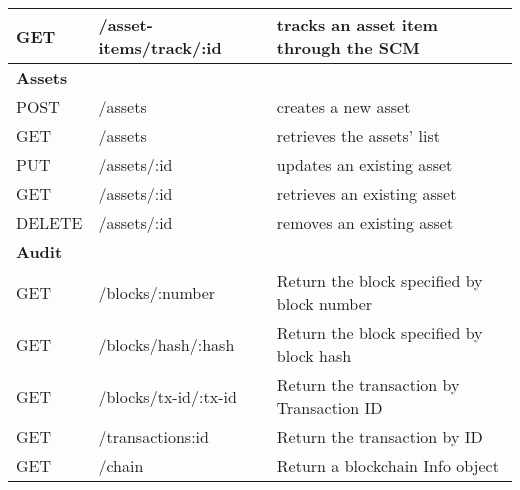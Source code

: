 \begin{table*}[ht]
\begin{center}
\begin{tabular}{|l|p{4.5cm}|p{7.664cm}|}
        \hline 
        GET & /asset-items/track/:id & tracks an asset item through the SCM\\
        \hline
        \cellcolor{cyan}\textbf{Assets}  & \cellcolor{cyan}\textbf{} & \cellcolor{cyan}\textbf{} \\
        \hline 
        POST & /assets & creates a new asset\\
        \hline 
        GET & /assets & retrieves the assets' list\\
        \hline 
        PUT & /assets/:id & updates an existing asset\\
        \hline 
        GET & /assets/:id & retrieves an existing asset\\
        \hline 
        DELETE & /assets/:id & removes an existing asset\\
        \hline 
        \cellcolor{cyan}\textbf{Audit}  & \cellcolor{cyan}\textbf{} & \cellcolor{cyan}\textbf{} \\
        \hline
         GET & /blocks/:number & Return the block specified by block number\\
        \hline 
         GET & /blocks/hash/:hash & Return the block specified by block hash\\
        \hline 
         GET & /blocks/tx-id/:tx-id & Return the transaction by Transaction ID\\
        \hline 
         GET & /transactions:id & Return the transaction by ID\\
        \hline 
         GET & /chain & Return a blockchain Info object\\
        \hline 
    \end{tabular}
    \end{center}
\end{table*}